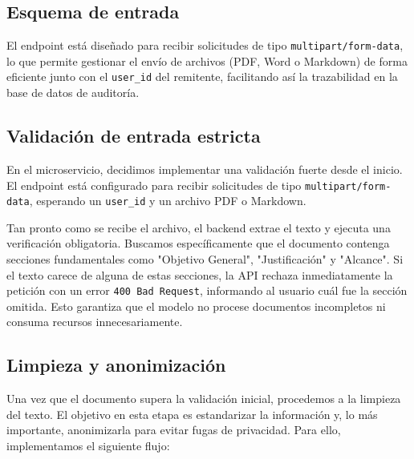 

\subsection{Esquema de entrada}

El endpoint está diseñado para recibir solicitudes de tipo \texttt{multipart/form-data}, lo que permite gestionar el envío de archivos (PDF, Word o Markdown) de forma eficiente junto con el \texttt{user\_id} del remitente, facilitando así la trazabilidad en la base de datos de auditoría.

\subsection{Validación de entrada estricta}

En el microservicio, decidimos implementar una validación fuerte desde el inicio. El endpoint está configurado para recibir solicitudes de tipo \texttt{multipart/form-data}, esperando un \texttt{user\_id} y un archivo PDF o Markdown. 

Tan pronto como se recibe el archivo, el backend extrae el texto y ejecuta una verificación obligatoria. Buscamos específicamente que el documento contenga secciones fundamentales como "Objetivo General", "Justificación" y "Alcance". Si el texto carece de alguna de estas secciones, la API rechaza inmediatamente la petición con un error \texttt{400 Bad Request}, informando al usuario cuál fue la sección omitida. Esto garantiza que el modelo no procese documentos incompletos ni consuma recursos innecesariamente.

\subsection{Limpieza y anonimización}

Una vez que el documento supera la validación inicial, procedemos a la limpieza del texto. El objetivo en esta etapa es estandarizar la información y, lo más importante, anonimizarla para evitar fugas de privacidad. Para ello, implementamos el siguiente flujo:

